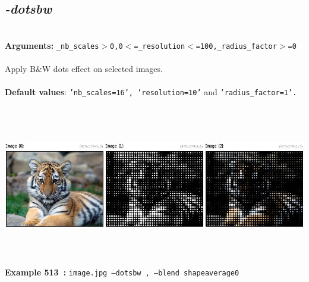 \documentclass[a4paper,11pt,twoside]{book}
\begin{document}
\subsection{\emph{-dotsbw} }\vspace*{-0.5em}
~\\\textbf{Arguments: } 
{\small \texttt{\_nb\_scales$>$0,0$<$=\_resolution$<$=100,\_radius\_factor$>$=0}}\\~\\
Apply B\&W dots effect on selected images.
~\\~\\\textbf{Default values}: {\small \texttt{'nb\_scales=16', 'resolution=10'} and \texttt{'radius\_factor=1'.}}
\begin{center}\includegraphics[keepaspectratio=true,height=7cm,width=\textwidth]{img/gmic_def513.jpg}\\
{\footnotesize \textbf{Example 513~:} \texttt{image.jpg --dotsbw , --blend shapeaverage0}}
\end{center}
\end{document}
